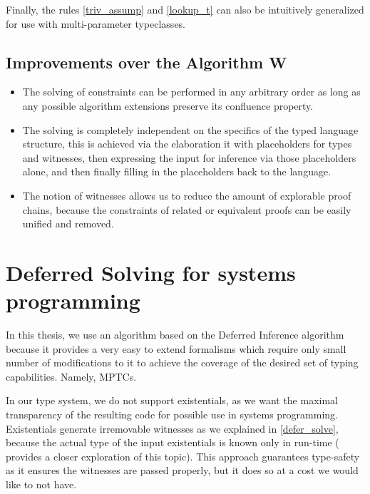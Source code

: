 Finally, the rules \ref{triv_assump} and \ref{lookup_t} can also be intuitively generalized for use with multi-parameter typeclasses.

\subsection{Improvements over the Algorithm W}


\begin{itemize}
    \item  The solving of constraints can be performed in any arbitrary order as long as any possible algorithm extensions preserve its confluence property.

    \item The solving is completely independent on the specifics of the typed language structure, this is achieved via the elaboration it with placeholders for types and witnesses, then expressing the input for inference via those placeholders alone, and then finally filling in the placeholders back to the language.

    \item The notion of witnesses allows us to reduce the amount of explorable proof chains, because the constraints of related or equivalent proofs can be easily unified and removed.
\end{itemize}


\section{Deferred Solving for systems programming}
\label{sys_defer}

In this thesis, we use an algorithm based on the Deferred Inference algorithm because it provides a very easy to extend formalisms which require only small number of modifications to it to achieve the coverage of the desired set of typing capabilities. Namely, MPTCs.

In our type system, we do not support existentials, as we want the maximal transparency of the resulting code for possible use in systems programming. Existentials generate irremovable witnesses as we explained in \cref{defer_solve}, because the actual type of the input existentials is known only in run-time (\citet{grossman2002existential} provides a closer exploration of this topic). This approach guarantees type-safety as it ensures the witnesses are passed properly, but it does so at a cost we would like to not have.

